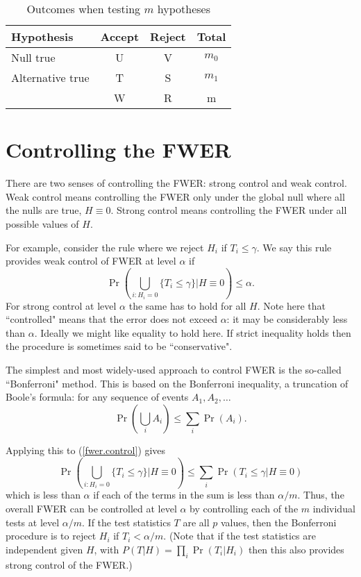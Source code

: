 \documentclass[times,11pt]{article}
\begin{document}
\begin{table} 
\begin{center}
\begin{tabular}{lccc}
Hypothesis & Accept & Reject & Total \\ \hline
Null true & U & V & $m_0$ \\
Alternative true & T & S & $m_1$ \\
& W & R & m \\
\end{tabular}
\end{center}
\caption{Outcomes when testing $m$ hypotheses} \label{multiple}
\end{table}

\section{Controlling the FWER}

There are two senses of controlling the FWER: strong control and weak control. 
Weak control means controlling the FWER only under the global null where all the nulls are true, $H \equiv 0$. Strong control means controlling the FWER under all 
possible values of $H$.

For example, consider the rule where we reject $H_i$ if $T_i \leq \gamma$. We say this rule provides weak control of FWER at level $\alpha$ if
\begin{equation}
\Pr \left(\bigcup_{i:H_i =0} \{T_i \leq \gamma\} \bigg| H \equiv 0 \right) \leq \alpha. \label{fwer.control}
\end{equation}
For strong control at level $\alpha$ the same has to hold for all $H$. Note here that ``controlled" means that the error does not exceed $\alpha$: it may be considerably less than $\alpha$. Ideally we might like equality to hold here. If strict inequality holds then the procedure is sometimes said to be ``conservative".

The simplest and most widely-used approach to control FWER is the so-called ``Bonferroni" method.
This is based on the Bonferroni inequality, a truncation of Boole's formula: for any sequence of events $A_1,A_2,\dots$
\begin{equation}
\Pr(\bigcup_i A_i) \leq \sum_i \Pr(A_i).
\end{equation}

Applying this to (\ref{fwer.control}) gives
\begin{equation} 
\Pr \left(\bigcup_{i:H_i =0} \{T_i \leq \gamma\} \bigg| H \equiv 0 \right) \leq \sum_i \Pr(T_i \leq \gamma | H \equiv 0)
\end{equation}
which is less than $\alpha$ if each of the terms in the sum is less than $\alpha/m$.
Thus, the overall FWER can be controlled at level $\alpha$ by controlling each of the $m$ individual tests at level $\alpha/m$. If the test statistics $T$ are
all $p$ values, then the Bonferroni procedure is to reject $H_i$ if $T_i < \alpha/m$. (Note that if the test statistics are independent given $H$, with $P(T | H) = \prod_i \Pr(T_i | H_i)$ then this also provides strong control of the FWER.)
\end{document}
